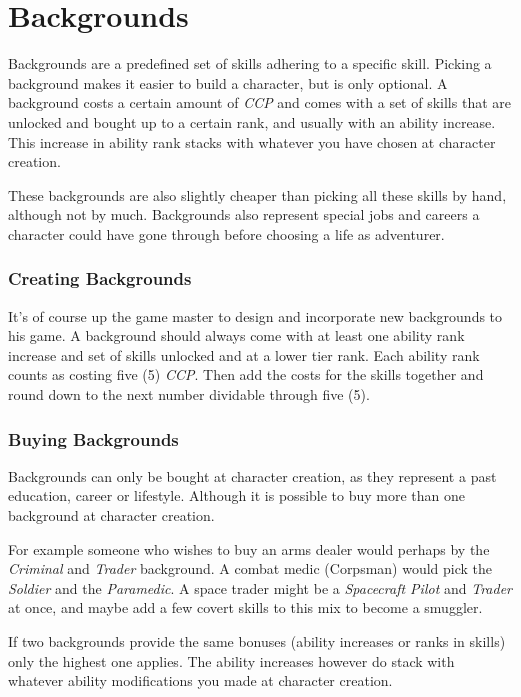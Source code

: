 \chapter{Backgrounds}

Backgrounds are a predefined set of skills adhering to a specific skill.
Picking a background makes it easier to build a character, but is only
optional. A background costs a certain amount of \emph{CCP} and comes with
a set of skills that are unlocked and bought up to a certain rank, and
usually with an ability increase. This increase in ability rank stacks
with whatever you have chosen at character creation.

These backgrounds are also slightly cheaper than picking all these skills
by hand, although not by much. Backgrounds also represent special jobs and
careers a character could have gone through before choosing a life as
adventurer.

\subsection{Creating Backgrounds}

It's of course up the game master to design and incorporate new backgrounds
to his game. A background should always come with at least one ability rank
increase and set of skills unlocked and at a lower tier rank. Each ability
rank counts as costing five (5) \emph{CCP}. Then add the costs for the skills
together and round down to the next number dividable through five (5).

\subsection{Buying Backgrounds}

Backgrounds can only be bought at character creation, as they represent a
past education, career or lifestyle. Although it is possible to buy more than
one background at character creation.

For example someone who wishes to buy an arms dealer would perhaps by the
\emph{Criminal} and \emph{Trader} background. A combat medic (Corpsman) would
pick the \emph{Soldier} and the \emph{Paramedic}. A space trader might be a
\emph{Spacecraft Pilot} and \emph{Trader} at once, and maybe add a few covert
skills to this mix to become a smuggler.

If two backgrounds provide the same bonuses (ability increases or ranks in
skills) only the highest one applies. The ability increases however do stack
with whatever ability modifications you made at character creation.

